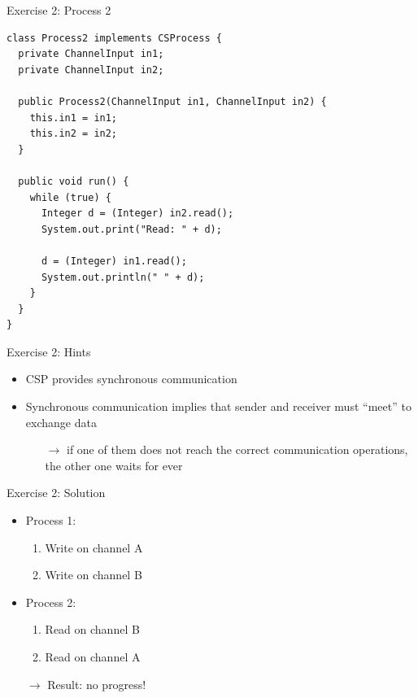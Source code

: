 \begin{frame}[fragile]{Exercise 2: Process 2}
\begin{lstlisting}[basicstyle=\fontsize{9}{11}\selectfont\ttfamily]
class Process2 implements CSProcess {
  private ChannelInput in1;
  private ChannelInput in2;

  public Process2(ChannelInput in1, ChannelInput in2) {
    this.in1 = in1;
    this.in2 = in2;
  }

  public void run() {
    while (true) {
      Integer d = (Integer) in2.read();
      System.out.print("Read: " + d);

      d = (Integer) in1.read();
      System.out.println(" " + d);
    }
  }
}
\end{lstlisting}
\end{frame}

\begin{frame}{Exercise 2: Hints}
  \begin{itemize}
  \item CSP provides synchronous communication
  \item Synchronous communication implies that sender and receiver
    must ``meet'' to exchange data
    \begin{itemize}
    \item[$\rightarrow$] if one of them does not reach the correct
      communication operations, the other one waits for ever
    \end{itemize}
  \end{itemize}
\end{frame}

\begin{frame}{Exercise 2: Solution}
  \begin{itemize}
  \item Process 1:
    \begin{enumerate}
    \item Write on channel A
    \item Write on channel B
    \end{enumerate}
  \item Process 2:
    \begin{enumerate}
    \item Read on channel B
    \item Read on channel A
    \end{enumerate}
  \item[$\rightarrow$] Result: no progress!
  \end{itemize}
\end{frame}

